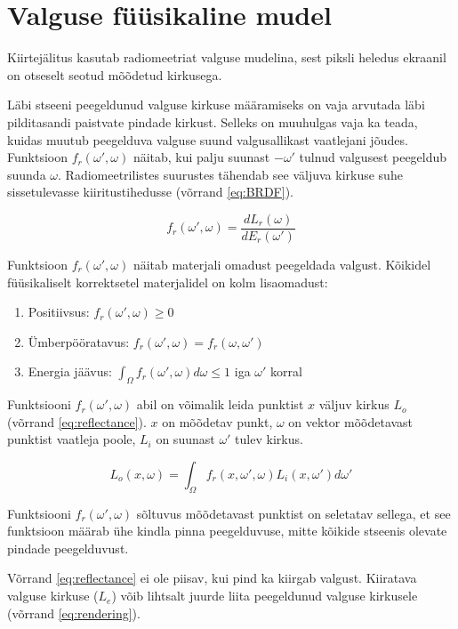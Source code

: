 \documentclass[a4paper,12pt]{report}
\begin{document}
\section{Valguse füüsikaline mudel}
Kiirtejälitus kasutab radiomeetriat valguse mudelina, sest piksli heledus
ekraanil on otseselt seotud mõõdetud kirkusega.

Läbi stseeni peegeldunud valguse kirkuse määramiseks on vaja arvutada
läbi pilditasandi paistvate pindade kirkust. Selleks on muuhulgas vaja
ka teada, kuidas muutub peegelduva valguse suund valgusallikast vaatlejani
jõudes. Funktsioon \(f_r(\omega', \omega)\) näitab, kui palju suunast
\(-\omega'\) tulnud valgusest peegeldub suunda \(\omega\). Radiomeetrilistes
suurustes tähendab see väljuva kirkuse suhe sissetulevasse kiiritustihedusse
(võrrand \ref{eq:BRDF}).

\begin{equation} \label{eq:BRDF}
f_r(\omega', \omega) = \frac{dL_r(\omega)}{dE_r(\omega')}
\end{equation}

Funktsioon \(f_r(\omega', \omega)\) näitab materjali omadust peegeldada
valgust. Kõikidel füüsikaliselt korrektsetel materjalidel on kolm
lisaomadust:

\begin{enumerate}
\item Positiivsus: \(f_r(\omega', \omega) \geq 0 \)
\item Ümberpööratavus: \(f_r(\omega', \omega) = f_r(\omega, \omega')\)
\item Energia jäävus: \(\int_\Omega f_r(\omega', \omega) d\omega \leq 1\) iga \(\omega'\) korral
\end{enumerate}

Funktsiooni \(f_r(\omega', \omega)\) abil on võimalik leida punktist \(x\)
väljuv kirkus \(L_o\) (võrrand \ref{eq:reflectance}). \(x\) on mõõdetav
punkt, \(\omega\) on vektor mõõdetavast punktist vaatleja poole,
\(L_i\) on suunast \(\omega'\) tulev kirkus.

\begin{equation} \label{eq:reflectance}
L_o(x, \omega) = \int_\Omega f_r(x, \omega', \omega) L_i(x, \omega') d\omega'
\end{equation}

Funktsiooni \(f_r(\omega', \omega)\) sõltuvus mõõdetavast punktist on
seletatav sellega, et see funktsioon määrab ühe kindla pinna
peegelduvuse, mitte kõikide stseenis olevate pindade peegelduvust.

Võrrand \ref{eq:reflectance} ei ole piisav, kui pind ka kiirgab valgust.
Kiiratava valguse kirkuse (\(L_e\)) võib lihtsalt juurde liita peegeldunud valguse
kirkusele (võrrand \ref{eq:rendering}).
\end{document}
